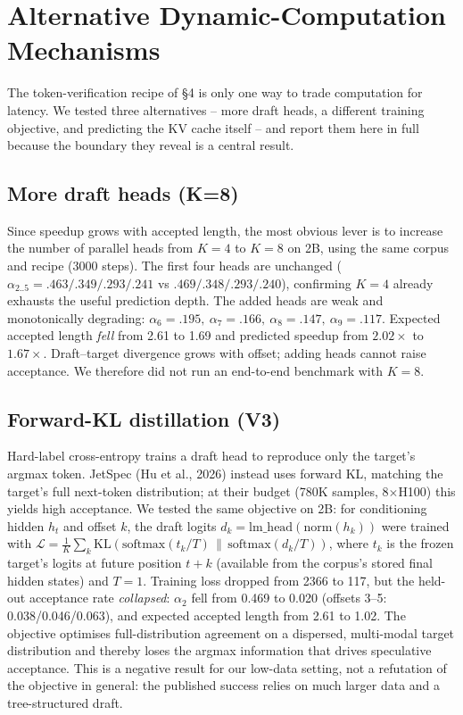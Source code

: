 \documentclass[11pt,a4paper]{article}
\begin{document}
\section{Alternative Dynamic-Computation Mechanisms}
\label{sec:alternatives}
The token-verification recipe of \S4 is only one way to trade computation for latency. We tested
three alternatives -- more draft heads, a different training objective, and predicting the KV cache
itself -- and report them here in full because the boundary they reveal is a central result.

\subsection{More draft heads (K=8)}
Since speedup grows with accepted length, the most obvious lever is to increase the number of
parallel heads from $K{=}4$ to $K{=}8$ on 2B, using the same corpus and recipe (3000 steps). The
first four heads are unchanged ($\alpha_{2..5}=.463/.349/.293/.241$ vs $.469/.348/.293/.240$),
confirming $K{=}4$ already exhausts the useful prediction depth. The added heads are weak and
monotonically degrading: $\alpha_6=.195,\ \alpha_7=.166,\ \alpha_8=.147,\ \alpha_9=.117$. Expected
accepted length \emph{fell} from 2.61 to 1.69 and predicted speedup from $2.02\times$ to $1.67\times$.
Draft--target divergence grows with offset; adding heads cannot raise acceptance. We therefore did
not run an end-to-end benchmark with $K{=}8$.

\subsection{Forward-KL distillation (V3)}
Hard-label cross-entropy trains a draft head to reproduce only the target's argmax token. JetSpec
(Hu et al., 2026) instead uses forward KL, matching the target's full next-token distribution; at
their budget (780K samples, 8$\times$H100) this yields high acceptance. We tested the same objective
on 2B: for conditioning hidden $h_t$ and offset $k$, the draft logits $d_k=\mathrm{lm\_head}(\mathrm{norm}(h_k))$
were trained with $\mathcal{L} = \frac{1}{K}\sum_k \mathrm{KL}(\mathrm{softmax}(t_k/T)\,\|\,\mathrm{softmax}(d_k/T))$,
where $t_k$ is the frozen target's logits at future position $t{+}k$ (available from the corpus's
stored final hidden states) and $T{=}1$. Training loss dropped from 2366 to 117, but the held-out
acceptance rate \emph{collapsed}: $\alpha_2$ fell from 0.469 to 0.020 (offsets 3--5: 0.038/0.046/0.063),
and expected accepted length from 2.61 to 1.02. The objective optimises full-distribution agreement
on a dispersed, multi-modal target distribution and thereby loses the argmax information that
drives speculative acceptance. This is a negative result for our low-data setting, not a refutation
of the objective in general: the published success relies on much larger data and a tree-structured
draft.
\end{document}
